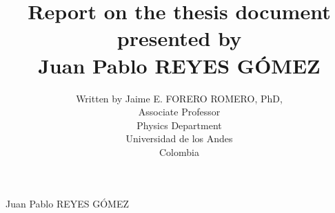 \documentclass{report}
\begin{document}
\title{Report on the thesis document presented by \\
Juan Pablo REYES G\'OMEZ}
\author{Written by Jaime E. FORERO ROMERO, PhD,\\
Associate Professor\\ Physics Department\\ Universidad de los Andes\\ Colombia}
\maketitle

Juan Pablo REYES G\'OMEZ
\end{document}
